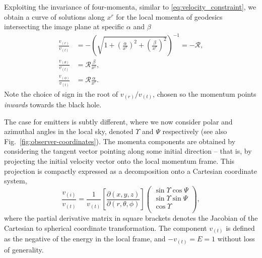 \documentclass[fleqn,usenatbib]{mnras}
\newcommand{\pderiv}[2]{\frac{\partial #1}{\partial #2}}
\begin{document}
Exploiting the invariance of four-momenta, similar to
\eqref{eq:velocity_constraint}, we obtain a curve of solutions along $x^r$ for
the local momenta of geodesics intersecting the image plane at specific
$\alpha$ and
$\beta$
\begin{align}
    \frac{v_{(r)}}{v_{(t)}} &= -\left( \sqrt{1 +
    \left(\frac{\alpha}{x^r}\right)^2 + \left(\frac{\beta}{x^r}\right)^2}
\right)^{-1} = -\mathscr{R}, \\
    \frac{v_{(\theta)}}{v_{(t)}} &= \mathscr{R} \frac{\beta}{x^r}, \\
    \frac{v_{(\phi)}}{v_{(t)}} &= \mathscr{R} \frac{\alpha}{x^r}.
\end{align}
Note the choice of sign in the root of $v_{(r)} / v_{(t)}$, chosen so the
momentum points \emph{inwards} towards the black hole.

The case for emitters is subtly different, where we now consider polar and
azimuthal angles in the local sky, denoted $\Upsilon$ and $\Psi$ respectively
(see also Fig.~\ref{fig:observer-coordinates}). The momenta components are
obtained by considering the tangent vector pointing along some initial direction
-- that is, by projecting the initial velocity vector onto the local momentum
frame. This projection is compactly expressed as a decomposition onto a
Cartesian coordinate system,
\begin{equation}
    \label{eq:local-angle-to-velocity}
    \frac{v_{(i)}}{v_{(t)}} = \frac{1}{v_{(t)}}
    \left[\pderiv{(x, y, z)}{(r, \theta, \phi)}\right]
    \left(
    \begin{matrix}
        \sin \Upsilon \cos \Psi \\
        \sin \Upsilon \sin \Psi \\
        \cos \Upsilon \\
    \end{matrix}
    \right),
\end{equation}
where the partial derivative matrix in square brackets denotes the Jacobian of
the Cartesian to spherical coordinate transformation. The component $v_{(t)}$ is
defined as the negative of the energy in the local frame, and $-v_{(t)}=E=1$
without loss of generality.
\end{document}
